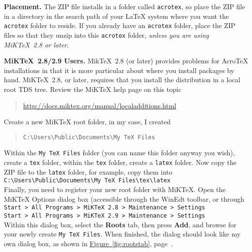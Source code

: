 \documentclass{article}
\def\latex/{{\protect\LaTeX}}
\def\tex/{{\protect\TeX}}
\begin{document}
\begin{questions}

\item \textbf{Placement.} The ZIP file installs in a folder called
    \texttt{acrotex}, so place the ZIP file in a directory in the search path
    of your \LaTeX{} system where you want the \texttt{acrotex} folder to
    reside. If you already have an \texttt{acrotex} folder, place the ZIP
    files so that they unzip into this \texttt{acrotex} folder, \emph{unless
    you are using MiK\TeX~2.8{} or later}.

\item[] \textbf{MiK\TeX~2.8/2.9 Users.} {Mik\TeX}~2.8 (or later) provides
    problems for {Acro\!\TeX} installations in that it is more particular
    about where you install packages by hand. {MiK\TeX}~2.8, or later,
    requires that you install the distribution in a local root TDS tree.
    Review the {MiK\TeX} help page on this topic
\begin{quote}
%
    \url{http://docs.miktex.org/manual/localadditions.html}
%
\end{quote}
Create a new {MiK\TeX} root folder, in my case, I created
\begin{quote}
%
    \verb!C:\Users\Public\Documents\My TeX Files!
%
\end{quote}
Within the \texttt{My TeX Files} folder (you can name this folder anyway
you wish), create a \texttt{tex} folder, within the \texttt{tex} folder,
create a \texttt{latex} folder. Now copy the ZIP file to the
\texttt{latex} folder, for example, copy them into
\\[3pt]\hspace*{20pt}
%
    \verb!C:\Users\Public\Documents\My TeX Files\tex\latex!\\[3pt]
%
Finally, you need to register your new root folder with MiK\TeX. Open the
{MiK\TeX} Options dialog box (accessible through the WinEdt toolbar, or
through\\[\topsep]\hspace*{20pt}
%
\texttt{Start > All Programs > MiKTeX 2.8 > Maintenance > Settings}\\[3pt]\hspace*{20pt}
\texttt{Start > All Programs > MiKTeX 2.9 > Maintenance > Settings}\\[\topsep]
%
Within this dialog box, select the \textbf{Roots} tab, then press
\textbf{Add}, and browse for your newly create \texttt{My TeX Files}. When
finished, the dialog should look like my own dialog box, as shown
in \hyperref[fig:rootstab]{Figure~\ref*{fig:rootstab}}, page~\pageref*{fig:rootstab}.


\end{questions}
\end{document}
